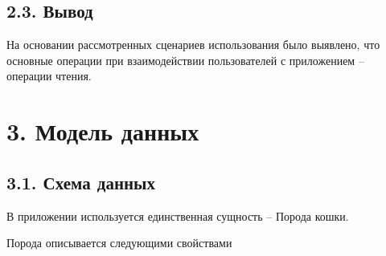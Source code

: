 \subsection*{2.3. Вывод}
На основании рассмотренных сценариев использования было выявлено,
что основные операции при взаимодействии пользователей с приложением --
операции чтения.

\pagebreak
{}
\section*{3. Модель данных}
\subsection*{3.1. Схема данных}
В приложении используется единственная сущность -- Порода кошки.

Порода описывается следующими свойствами

